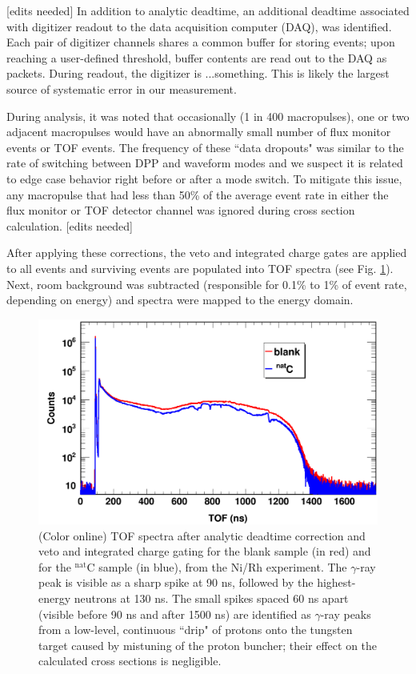 \documentclass[twocolumn,secnumarabic,amssymb, nobibnotes, aps, prl,
superscriptaddress, nobalancelastpage]{revtex4}
\begin{document}
[edits needed]
In addition to analytic deadtime, an additional deadtime associated with digitizer readout 
to the data acquisition computer (DAQ), was identified. Each pair of
digitizer channels shares a common buffer for storing events; upon reaching a
user-defined threshold, buffer contents are read out to the DAQ as packets.
During readout, the digitizer is ...something.
This is likely the largest source of systematic error in our measurement.

During analysis, it was noted that occasionally (1 in 400 macropulses), one or two 
adjacent macropulses would have an abnormally small number of flux monitor events or 
TOF events. The frequency of these ``data dropouts" was similar to the rate of
switching between DPP and waveform modes and we suspect it is related to edge
case behavior right before or after a mode switch. To mitigate this issue,
any macropulse that had less than 50\% of the average event rate in either the
flux monitor or TOF detector channel was ignored during cross section calculation.
[edits needed]

After applying these corrections, the veto and integrated charge gates are applied to 
all events and surviving events are populated into TOF spectra (see Fig.
\ref{ExampleTOFSpectrum}). Next, room background was subtracted (responsible for 0.1\% to 
1\% of event rate, depending on energy) and spectra were mapped to the energy domain.

\begin{figure}
    \includegraphics[scale=0.3]{figures/exampleTOFSpectrum.png}
    \caption{(Color online) TOF spectra after analytic deadtime correction and
        veto and integrated charge gating for the blank sample (in
        red) and for the $^{\text{nat}}$C sample (in blue), from the Ni/Rh experiment.
        The $\gamma$-ray peak is visible as a sharp spike at 90 ns, followed by
        the highest-energy neutrons at 130 ns. The small spikes spaced 60 ns
        apart (visible before 90 ns and after 1500
        ns) are identified as $\gamma$-ray peaks from a low-level, continuous ``drip" 
        of protons onto the tungsten target caused by mistuning of the proton 
        buncher; their effect on the calculated cross sections is negligible.
    }
    \label{ExampleTOFSpectrum}
\end{figure}
\end{document}
